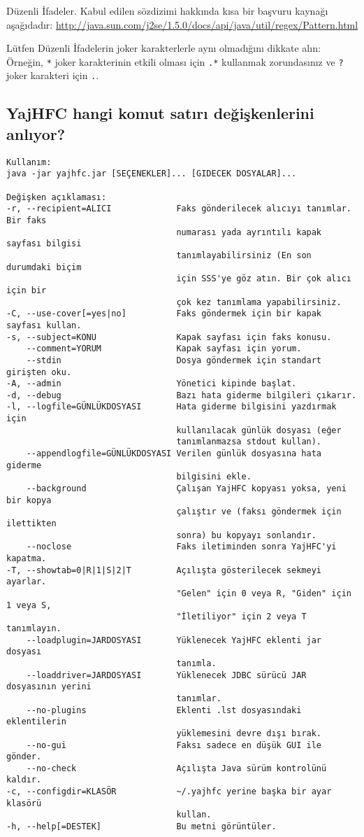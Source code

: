 \documentclass[a4paper,10pt]{scrartcl}
\begin{document}
Düzenli İfadeler. Kabul edilen sözdizimi hakkında kısa bir başvuru kaynağı aşağıdadır:
\url{http://java.sun.com/j2se/1.5.0/docs/api/java/util/regex/Pattern.html}

Lütfen Düzenli İfadelerin joker karakterlerle aynı olmadığını dikkate alın:
Örneğin, \verb.*. joker karakterinin etkili olması için \verb#.*# kullanmak zorundasınız 
ve \verb#?# joker karakteri için \verb#.#.

\subsection{YajHFC hangi komut satırı değişkenlerini anlıyor?}

\begin{verbatim}
Kullanım:
java -jar yajhfc.jar [SEÇENEKLER]... [GIDECEK DOSYALAR]...

Değişken açıklaması:
-r, --recipient=ALICI             Faks gönderilecek alıcıyı tanımlar. Bir faks
                                  numarası yada ayrıntılı kapak sayfası bilgisi
                                  tanımlayabilirsiniz (En son durumdaki biçim
                                  için SSS'ye göz atın. Bir çok alıcı için bir
                                  çok kez tanımlama yapabilirsiniz.
-C, --use-cover[=yes|no]          Faks göndermek için bir kapak sayfası kullan.
-s, --subject=KONU                Kapak sayfası için faks konusu.
    --comment=YORUM               Kapak sayfası için yorum.
    --stdin                       Dosya göndermek için standart girişten oku.
-A, --admin                       Yönetici kipinde başlat.
-d, --debug                       Bazı hata giderme bilgileri çıkarır.
-l, --logfile=GÜNLÜKDOSYASI       Hata giderme bilgisini yazdırmak için
                                  kullanılacak günlük dosyası (eğer
                                  tanımlanmazsa stdout kullan).
    --appendlogfile=GÜNLÜKDOSYASI Verilen günlük dosyasına hata giderme
                                  bilgisini ekle.
    --background                  Çalışan YajHFC kopyası yoksa, yeni bir kopya
                                  çalıştır ve (faksı göndermek için ilettikten
                                  sonra) bu kopyayı sonlandır.
    --noclose                     Faks iletiminden sonra YajHFC'yi kapatma.
-T, --showtab=0|R|1|S|2|T         Açılışta gösterilecek sekmeyi ayarlar.
                                  "Gelen" için 0 veya R, "Giden" için 1 veya S,
                                  "İletiliyor" için 2 veya T tanımlayın.
    --loadplugin=JARDOSYASI       Yüklenecek YajHFC eklenti jar dosyası
                                  tanımla.
    --loaddriver=JARDOSYASI       Yüklenecek JDBC sürücü JAR dosyasının yerini
                                  tanımlar.
    --no-plugins                  Eklenti .lst dosyasındaki eklentilerin
                                  yüklemesini devre dışı bırak.
    --no-gui                      Faksı sadece en düşük GUI ile gönder.
    --no-check                    Açılışta Java sürüm kontrolünü kaldır.
-c, --configdir=KLASÖR            ~/.yajhfc yerine başka bir ayar klasörü
                                  kullan.
-h, --help[=DESTEK]               Bu metni görüntüler.
\end{verbatim}
\end{document}
